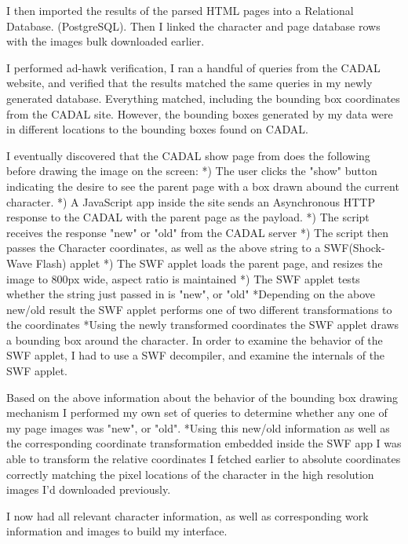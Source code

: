             I then imported the results of the parsed HTML pages into a Relational Database. (PostgreSQL).  Then I linked the character and page database rows with the images bulk downloaded earlier.
            
            I performed ad-hawk verification, I ran a handful of queries from the CADAL website, and verified that the results matched the same queries in my newly generated database.   Everything matched, including the bounding box coordinates from the CADAL site.  However, the bounding boxes generated by my data were in different locations to the bounding boxes found on CADAL.
            
            
            I eventually discovered that the CADAL show page from does the following before drawing the image on the screen:
                *) The user clicks the "show" button indicating the desire to see the parent page with a box drawn abound the current character.
                *) A JavaScript app inside the site sends an Asynchronous HTTP response to the CADAL with the parent page as the payload.
                *) The script receives the response "new" or "old" from the CADAL server
                *) The script then passes the Character coordinates, as well as the above string to a SWF(Shock-Wave Flash) applet
                *) The SWF applet loads the parent page, and resizes the image to 800px wide, aspect ratio is maintained
                *) The SWF applet tests whether the string just passed in is "new", or "old"
                    *Depending on the above new/old result the SWF applet performs one of two different transformations to the coordinates
                    *Using the newly transformed coordinates the SWF applet draws a bounding box around the character.
                In order to examine the behavior of the SWF applet, I had to use a SWF decompiler, and examine the internals of the SWF applet.
            
                Based on the above information about the behavior of the bounding box drawing mechanism I performed my own set of queries to determine whether any one of my page images was "new", or "old".
                *Using this new/old information as well as the corresponding coordinate transformation embedded inside the SWF app I was able to transform the relative coordinates I fetched earlier to absolute coordinates correctly matching the pixel locations of the character in the high resolution images I'd downloaded previously.
                
                
                I now had all relevant character information, as well as corresponding work information and images to build my interface.
                
